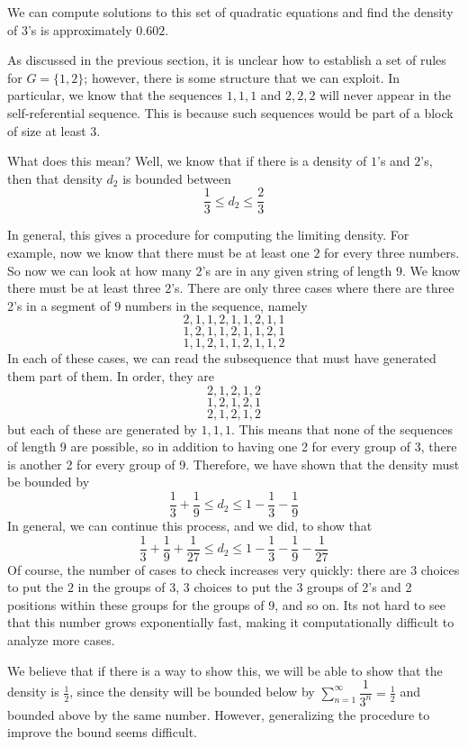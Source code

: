 \documentclass[runningheads,a4paper]{llncs}
\begin{document}
We can compute solutions to this set of quadratic equations and find the density of 3's is approximately $0.602$.

As discussed in the previous section, it is unclear how to establish a set of rules for $G = \{1 , 2\}$; however, there is some structure that we can exploit. In particular, we know that the sequences $1, 1, 1$ and $2, 2, 2$ will never appear in the self-referential sequence. This is because such sequences would be part of a block of size at least $3$. 

What does this mean? Well, we know that if there is a density of $1$'s and $2$'s, then that density $d_2$ is bounded between 
\[ \dfrac{1}{3} \leq d_2 \leq \dfrac{2}{3} \]

In general, this gives a procedure for computing the limiting density. For example, now we know that there must be at least one $2$ for every three numbers. So now we can look at how many $2$'s are in any given string of length $9$. We know there must be at least three $2$'s. There are only three cases where there are three 2's in a segment of $9$ numbers in the sequence, namely
\[ 2, 1, 1, 2, 1, 1 ,2 , 1, 1 \]
\[ 1, 2, 1, 1, 2, 1, 1, 2, 1 \]
\[ 1, 1, 2, 1, 1, 2, 1, 1, 2 \]
In each of these cases, we can read the subsequence that must have generated them part of them. In order, they are
\[ 2, 1, 2, 1, 2 \]
\[ 1, 2, 1, 2, 1\]
\[ 2, 1, 2, 1, 2 \]
but each of these are generated by $1, 1, 1$. This means that none of the sequences of length 9 are possible, so in addition to having one 2 for every group of 3, there is another 2 for every group of 9. Therefore, we have shown that the density must be bounded by
\[ \dfrac{1}{3} + \dfrac{1}{9} \leq d_2 \leq 1 - \dfrac{1}{3} - \dfrac{1}{9} \]
In general, we can continue this process, and we did, to show that
\[ \dfrac{1}{3} + \dfrac{1}{9} + \dfrac{1}{27} \leq d_2 \leq 1 - \dfrac{1}{3} - \dfrac{1}{9} - \dfrac{1}{27} \]
Of course, the number of cases to check increases very quickly: there are $3$ choices to put the $2$ in the groups of $3$, $3$ choices to put the 3 groups of 2's and 2 positions within these groups for the groups of 9, and so on. Its not hard to see that this number grows exponentially fast, making it computationally difficult to analyze more cases.

We believe that if there is a way to show this, we will be able to show that the density is $\frac{1}{2}$, since the density will be bounded below by $\sum_{n=1}^\infty \dfrac{1}{3^n} = \frac{1}{2}$ and bounded above by the same number. However, generalizing the procedure to improve the bound seems difficult.   
\end{document}
